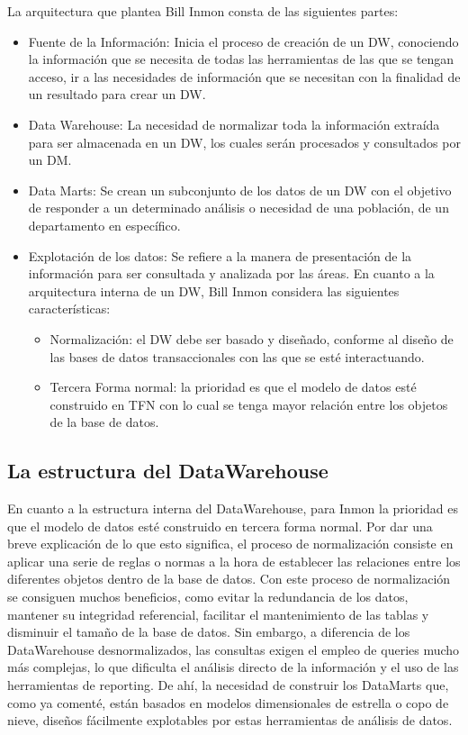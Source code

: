 \documentclass[preprint,12pt]{elsarticle}
\begin{document}
La arquitectura que plantea Bill Inmon consta de las siguientes partes: 
\begin{itemize}
		\item Fuente de la Información: Inicia el proceso de creación de un DW, conociendo la información que se necesita de todas las herramientas de las que se tengan acceso, ir a las necesidades de información que se necesitan con la finalidad de un resultado para crear un DW.

		\item Data Warehouse: La necesidad de normalizar toda la información extraída para ser almacenada en un DW, los cuales serán procesados y consultados por un DM.
		\item Data Marts: Se crean un subconjunto de los datos de un DW con el objetivo de responder a un determinado análisis o necesidad de una población, de un departamento en específico.
		\item Explotación de los datos: Se refiere a la manera de presentación de la información para ser consultada y analizada por las áreas. En cuanto a la arquitectura interna de un DW, Bill Inmon considera las siguientes características:

			\begin{itemize}
				\item Normalización: el DW debe ser basado y diseñado, conforme al diseño de las bases de datos transaccionales con las que se esté interactuando.
				\item Tercera Forma normal: la prioridad es que el modelo de datos esté construido en TFN con lo cual se tenga mayor relación entre los objetos de la base de datos.
			\end{itemize}

\end{itemize}
\subsection{La estructura del DataWarehouse}	
En cuanto a la estructura interna del DataWarehouse, para Inmon la prioridad es que el modelo de datos esté construido en tercera forma normal. Por dar una breve explicación de lo que esto significa, el proceso de normalización consiste en aplicar una serie de reglas o normas a la hora de establecer las relaciones entre los diferentes objetos dentro de la base de datos. Con este proceso de normalización se consiguen muchos beneficios, como evitar la redundancia de los datos, mantener su integridad referencial, facilitar el mantenimiento de las tablas y disminuir el tamaño de la base de datos. Sin embargo, a diferencia de los DataWarehouse desnormalizados, las consultas exigen el empleo de queries mucho más complejas, lo que dificulta el análisis directo de la información y el uso de las herramientas de reporting. De ahí, la necesidad de construir los DataMarts que, como ya comenté, están basados en modelos dimensionales de estrella o copo de nieve, diseños fácilmente explotables por estas herramientas de análisis de datos.
\end{document}
